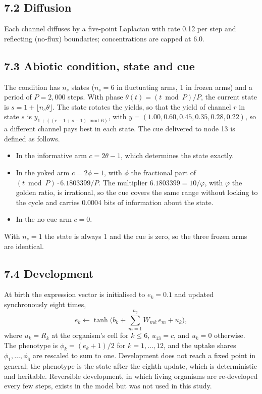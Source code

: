 \subsection*{7.2 Diffusion}
Each channel diffuses by a five-point Laplacian with rate 0.12 per step and
reflecting (no-flux) boundaries; concentrations are capped at 6.0.

\subsection*{7.3 Abiotic condition, state and cue}
The condition has $n_s$ states ($n_s=6$ in fluctuating arms, 1 in frozen arms) and
a period of $P=2{,}000$ steps. With phase $\theta(t) = (t \bmod P)/P$, the current
state is $s = 1 + \lfloor n_s\theta\rfloor$. The state rotates the yields, so that the yield of channel $r$ in state $s$ is $y_{1 + ((r-1+s-1) \bmod 6)}$, with
$y = (1.00, 0.60, 0.45, 0.35, 0.28, 0.22)$, so a different channel pays best in each state. The cue delivered to node 13 is defined as follows.
\begin{itemize}
\item In the informative arm $c = 2\theta - 1$, which determines the state exactly.
\item In the yoked arm $c = 2\phi - 1$, with $\phi$ the fractional part of
  $(t \bmod P)\cdot 6.1803399/P$. The multiplier $6.1803399 = 10/\varphi$, with
  $\varphi$ the golden ratio, is irrational, so the cue covers the same range
  without locking to the cycle and carries 0.0004 bits of information about the
  state.
\item In the no-cue arm $c=0$.
\end{itemize}
With $n_s = 1$ the state is always 1 and the cue is zero, so the three frozen arms
are identical.

\subsection*{7.4 Development}
At birth the expression vector is initialised to $e_k = 0.1$ and updated
synchronously eight times,
\begin{equation*}
e_k \leftarrow \tanh\Big(b_k + \sum_{m=1}^{n_g} W_{mk}\,e_m + u_k\Big),
\end{equation*}
where $u_k = R_k$ at the organism's cell for $k\le 6$, $u_{13}=c$, and $u_k=0$
otherwise. The phenotype is $\phi_k = (e_k+1)/2$ for $k=1,\dots,12$, and the
uptake shares $\phi_1,\dots,\phi_6$ are rescaled to sum to one. Development does
not reach a fixed point in general; the phenotype is the state after the eighth
update, which is deterministic and heritable. Reversible development, in which living organisms are re-developed every few steps, exists in the model but was not used in this study.

